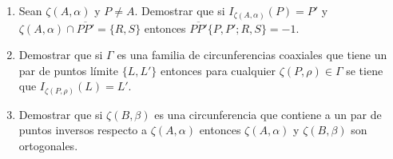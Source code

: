 \documentclass[10pt]{report}
\newcommand{\R}{\mathbb R}
\begin{document}
\begin{enumerate}

\item Sean $\zeta(A, \alpha)$ y $P \neq A$. Demostrar que si $I_{\zeta(A, \alpha)} (P) = P'$ y $\zeta(A, \alpha) \cap \overline{PP'} = \{ R, S \}$ entonces $\overline{PP'}\{P, P'; R, S\} = -1$.


\item Demostrar que si $\Gamma$ es una familia de circunferencias coaxiales que tiene un par de puntos límite $\{L,L'\}$ entonces para cualquier $\zeta(P,\rho) \in \Gamma$ se tiene que $I_{\zeta(P, \rho)}(L) = L'$.

\item Demostrar que si $\zeta(B, \beta)$ es una circunferencia que contiene a un par de puntos inversos respecto a $\zeta(A, \alpha)$ entonces $\zeta(A,\alpha)$ y $\zeta(B, \beta)$ son ortogonales.







\end{enumerate}
\end{document}
